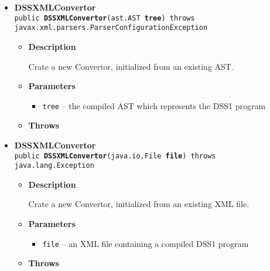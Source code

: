 {{{{{\begin{itemize}
{\begin{itemize}
{Create a convertor with no program.
}
\item{{\bf  Throws}
}%
\end{itemize}
}%
\item{ 
\hypertarget{org.openmrs.module.dssmodule.DSSXMLConvertor(org.openmrs.module.dssmodule.ast.AST)}{{\bf  DSSXMLConvertor}\\}
\texttt{public\ {\bf  DSSXMLConvertor}(\texttt{ast.AST} {\bf  tree}) throws javax.xml.parsers.ParserConfigurationException
\label{org.openmrs.module.dssmodule.DSSXMLConvertor(org.openmrs.module.dssmodule.ast.AST)}}%
\begin{itemize}
\item{
{\bf  Description}

Crate a new Convertor, initialized from an existing AST.
}
\item{
{\bf  Parameters}
  \begin{itemize}
   \item{
\texttt{tree} -- the compiled AST which represents the DSS1 program}
  \end{itemize}
}%
\item{{\bf  Throws}
}%
\end{itemize}
}%
\item{ 
\hypertarget{org.openmrs.module.dssmodule.DSSXMLConvertor(java.io.File)}{{\bf  DSSXMLConvertor}\\}
\texttt{public\ {\bf  DSSXMLConvertor}(\texttt{java.io.File} {\bf  file}) throws java.lang.Exception
\label{org.openmrs.module.dssmodule.DSSXMLConvertor(java.io.File)}}%
\begin{itemize}
\item{
{\bf  Description}

Crate a new Convertor, initialized from an existing XML file.
}
\item{
{\bf  Parameters}
  \begin{itemize}
   \item{
\texttt{file} -- an XML file containing a compiled DSS1 program}
  \end{itemize}
}%
\item{{\bf  Throws}
}%
\end{itemize}
}%
\end{itemize}
}
}}}}
